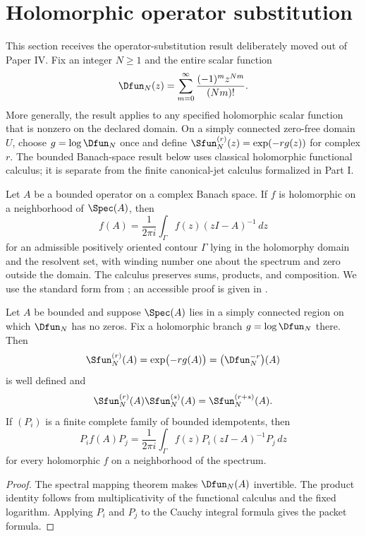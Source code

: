 \section{Holomorphic operator substitution}\label{sec:operator_substitution}

This section receives the operator-substitution result deliberately moved out of Paper IV. Fix an integer $N\geq1$ and the entire scalar function
\[
\Dfun_N(z)=\sum_{m=0}^{\infty}\frac{(-1)^m z^{Nm}}{(Nm)!}.
\]
More generally, the result applies to any specified holomorphic scalar function that is nonzero on the declared domain. On a simply connected zero-free domain $U$, choose $g=\log\Dfun_N$ once and define $\Sfun_N^{(r)}(z)=\exp(-r g(z))$ for complex $r$. The bounded Banach-space result below uses classical holomorphic functional calculus; it is separate from the finite canonical-jet calculus formalized in Part I.

\begin{standardfact}\label{sf:holomorphic_calculus}
Let $A$ be a bounded operator on a complex Banach space.  If $f$ is holomorphic on a neighborhood of $\Spec(A)$, then
\[
f(A)
=
\frac1{2\pi i}\int_\Gamma f(z)(zI-A)^{-1}\,dz
\]
for an admissible positively oriented contour $\Gamma$ lying in the holomorphy domain and the resolvent set, with winding number one about the spectrum and zero outside the domain. The calculus preserves sums, products, and composition.  We use the standard form from \cite{DunfordSchwartz1958}; an accessible proof is given in \cite[Appendix A]{TaylorBanachAlgebras}.
\end{standardfact}

\begin{proposition}\label{prop:operator_reciprocal}
Let $A$ be bounded and suppose $\Spec(A)$ lies in a simply connected region on which $\Dfun_N$ has no zeros.  Fix a holomorphic branch $g=\log\Dfun_N$ there.  Then
\[
\Sfun_N^{(r)}(A)
=
\exp\bigl(-r g(A)\bigr)
=
\bigl(\Dfun_N^{-r}\bigr)(A)
\]
is well defined and
\[
\Sfun_N^{(r)}(A)\Sfun_N^{(s)}(A)
=
\Sfun_N^{(r+s)}(A).
\]
If $(P_i)$ is a finite complete family of bounded idempotents, then
\[
P_i f(A)P_j
=
\frac1{2\pi i}
\int_\Gamma
f(z)P_i(zI-A)^{-1}P_j\,dz
\]
for every holomorphic $f$ on a neighborhood of the spectrum.
\end{proposition}

\begin{proof}
The spectral mapping theorem makes $\Dfun_N(A)$ invertible.  The product identity follows from multiplicativity of the functional calculus and the fixed logarithm.  Applying $P_i$ and $P_j$ to the Cauchy integral formula gives the packet formula.
\end{proof}

